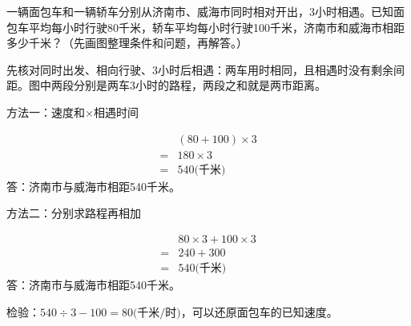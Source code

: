 一辆面包车和一辆轿车分别从济南市、威海市同时相对开出，3小时相遇。已知面包车平均每小时行驶80千米，轿车平均每小时行驶100千米，济南市和威海市相距多少千米？（先画图整理条件和问题，再解答。）\par
\begin{BookAnswer}
先核对同时出发、相向行驶、3小时后相遇：两车用时相同，且相遇时没有剩余间距。图中两段分别是两车3小时的路程，两段之和就是两市距离。\par 方法一：速度和×相遇时间\par \[\begin{aligned} &(80+100)\times3\\={}&180\times3\\={}&540\text{(千米)}\end{aligned}\]答：济南市与威海市相距540千米。\par 方法二：分别求路程再相加\par \[\begin{aligned} &80\times3+100\times3\\={}&240+300\\={}&540\text{(千米)}\end{aligned}\]答：济南市与威海市相距540千米。\par 检验：\(540\div3-100=80\text{(千米/时)}\)，可以还原面包车的已知速度。
\end{BookAnswer}

